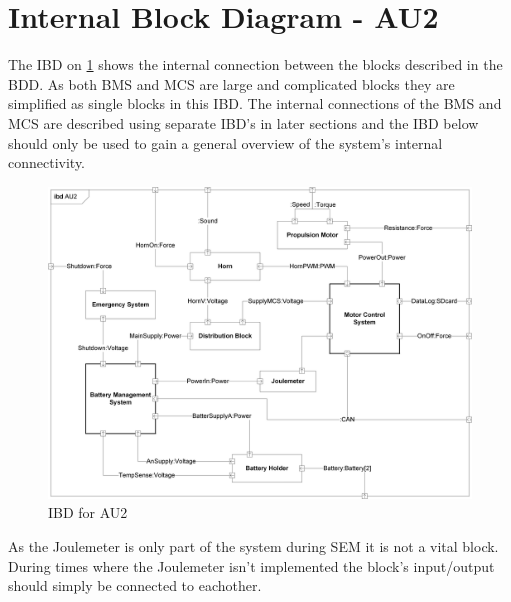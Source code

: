\section{Internal Block Diagram - AU2}
The IBD on \ref{fig:IBD} shows the internal connection between the blocks described in the BDD. As both BMS and MCS are large and complicated blocks they are simplified as single blocks in this IBD. The internal connections of the BMS and MCS are described using separate IBD's in later sections and the IBD below should only be used to gain a general overview of the system's internal connectivity. 

\begin{figure}[H]
	\centering
	\includegraphics[width=1\linewidth]{Architecture/Diagrams/IBD_AU2}
	\caption{IBD for AU2}
	\label{fig:IBD}
\end{figure}

As the Joulemeter is only part of the system during SEM it is not a vital block. During times where the Joulemeter isn't implemented the block's input/output should simply be connected to eachother.

